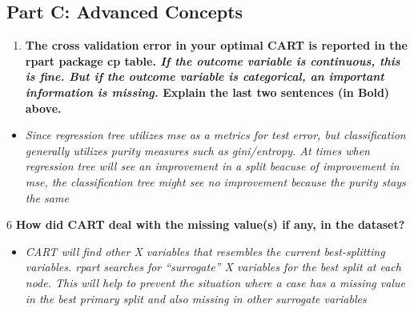 \documentclass[]{article}
\providecommand{\tightlist}{%
  \setlength{\itemsep}{0pt}\setlength{\parskip}{0pt}}
\begin{document}
\hypertarget{part-c-advanced-concepts}{%
\subsection{Part C: Advanced Concepts}\label{part-c-advanced-concepts}}

\begin{enumerate}
\def\labelenumi{\arabic{enumi}.}
\setcounter{enumi}{4}
\tightlist
\item
  \textbf{The cross validation error in your optimal CART is reported in
  the rpart package cp table. \emph{If the outcome variable is
  continuous, this is fine. But if the outcome variable is categorical,
  an important information is missing.} Explain the last two sentences
  (in Bold) above.}
\end{enumerate}

\begin{itemize}
\tightlist
\item
  \emph{Since regression tree utilizes mse as a metrics for test error,
  but classification generally utilizes purity measures such as
  gini/entropy. At times when regression tree will see an improvement in
  a split beacuse of improvement in mse, the classification tree might
  see no improvement because the purity stays the same}
\end{itemize}

6 \textbf{How did CART deal with the missing value(s) if any, in the
dataset?}

\begin{itemize}
\tightlist
\item
  \emph{CART will find other X variables that resembles the current
  best-splitting variables. rpart searches for ``surrogate'' X variables
  for the best split at each node. This will help to prevent the
  situation where a case has a missing value in the best primary split
  and also missing in other surrogate variables}
\end{itemize}
\end{document}
